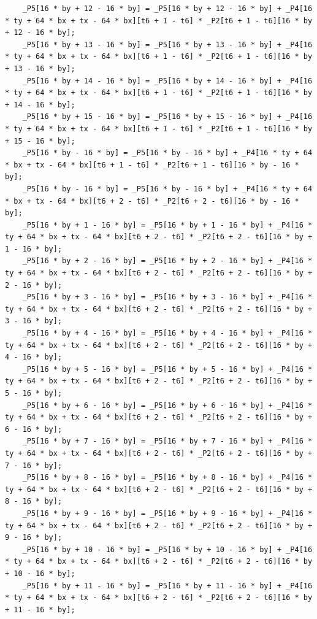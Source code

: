\documentclass[msthesis,justified,copyright,final,numbers,sort&compress,
gsmodern,amstex,natbib]{uothesis}
\begin{document}
\begin{lstlisting}
    _P5[16 * by + 12 - 16 * by] = _P5[16 * by + 12 - 16 * by] + _P4[16 * ty + 64 * bx + tx - 64 * bx][t6 + 1 - t6] * _P2[t6 + 1 - t6][16 * by + 12 - 16 * by];
    _P5[16 * by + 13 - 16 * by] = _P5[16 * by + 13 - 16 * by] + _P4[16 * ty + 64 * bx + tx - 64 * bx][t6 + 1 - t6] * _P2[t6 + 1 - t6][16 * by + 13 - 16 * by];
    _P5[16 * by + 14 - 16 * by] = _P5[16 * by + 14 - 16 * by] + _P4[16 * ty + 64 * bx + tx - 64 * bx][t6 + 1 - t6] * _P2[t6 + 1 - t6][16 * by + 14 - 16 * by];
    _P5[16 * by + 15 - 16 * by] = _P5[16 * by + 15 - 16 * by] + _P4[16 * ty + 64 * bx + tx - 64 * bx][t6 + 1 - t6] * _P2[t6 + 1 - t6][16 * by + 15 - 16 * by];
    _P5[16 * by - 16 * by] = _P5[16 * by - 16 * by] + _P4[16 * ty + 64 * bx + tx - 64 * bx][t6 + 1 - t6] * _P2[t6 + 1 - t6][16 * by - 16 * by];
    _P5[16 * by - 16 * by] = _P5[16 * by - 16 * by] + _P4[16 * ty + 64 * bx + tx - 64 * bx][t6 + 2 - t6] * _P2[t6 + 2 - t6][16 * by - 16 * by];
    _P5[16 * by + 1 - 16 * by] = _P5[16 * by + 1 - 16 * by] + _P4[16 * ty + 64 * bx + tx - 64 * bx][t6 + 2 - t6] * _P2[t6 + 2 - t6][16 * by + 1 - 16 * by];
    _P5[16 * by + 2 - 16 * by] = _P5[16 * by + 2 - 16 * by] + _P4[16 * ty + 64 * bx + tx - 64 * bx][t6 + 2 - t6] * _P2[t6 + 2 - t6][16 * by + 2 - 16 * by];
    _P5[16 * by + 3 - 16 * by] = _P5[16 * by + 3 - 16 * by] + _P4[16 * ty + 64 * bx + tx - 64 * bx][t6 + 2 - t6] * _P2[t6 + 2 - t6][16 * by + 3 - 16 * by];
    _P5[16 * by + 4 - 16 * by] = _P5[16 * by + 4 - 16 * by] + _P4[16 * ty + 64 * bx + tx - 64 * bx][t6 + 2 - t6] * _P2[t6 + 2 - t6][16 * by + 4 - 16 * by];
    _P5[16 * by + 5 - 16 * by] = _P5[16 * by + 5 - 16 * by] + _P4[16 * ty + 64 * bx + tx - 64 * bx][t6 + 2 - t6] * _P2[t6 + 2 - t6][16 * by + 5 - 16 * by];
    _P5[16 * by + 6 - 16 * by] = _P5[16 * by + 6 - 16 * by] + _P4[16 * ty + 64 * bx + tx - 64 * bx][t6 + 2 - t6] * _P2[t6 + 2 - t6][16 * by + 6 - 16 * by];
    _P5[16 * by + 7 - 16 * by] = _P5[16 * by + 7 - 16 * by] + _P4[16 * ty + 64 * bx + tx - 64 * bx][t6 + 2 - t6] * _P2[t6 + 2 - t6][16 * by + 7 - 16 * by];
    _P5[16 * by + 8 - 16 * by] = _P5[16 * by + 8 - 16 * by] + _P4[16 * ty + 64 * bx + tx - 64 * bx][t6 + 2 - t6] * _P2[t6 + 2 - t6][16 * by + 8 - 16 * by];
    _P5[16 * by + 9 - 16 * by] = _P5[16 * by + 9 - 16 * by] + _P4[16 * ty + 64 * bx + tx - 64 * bx][t6 + 2 - t6] * _P2[t6 + 2 - t6][16 * by + 9 - 16 * by];
    _P5[16 * by + 10 - 16 * by] = _P5[16 * by + 10 - 16 * by] + _P4[16 * ty + 64 * bx + tx - 64 * bx][t6 + 2 - t6] * _P2[t6 + 2 - t6][16 * by + 10 - 16 * by];
    _P5[16 * by + 11 - 16 * by] = _P5[16 * by + 11 - 16 * by] + _P4[16 * ty + 64 * bx + tx - 64 * bx][t6 + 2 - t6] * _P2[t6 + 2 - t6][16 * by + 11 - 16 * by];

\end{lstlisting}
\end{document}
